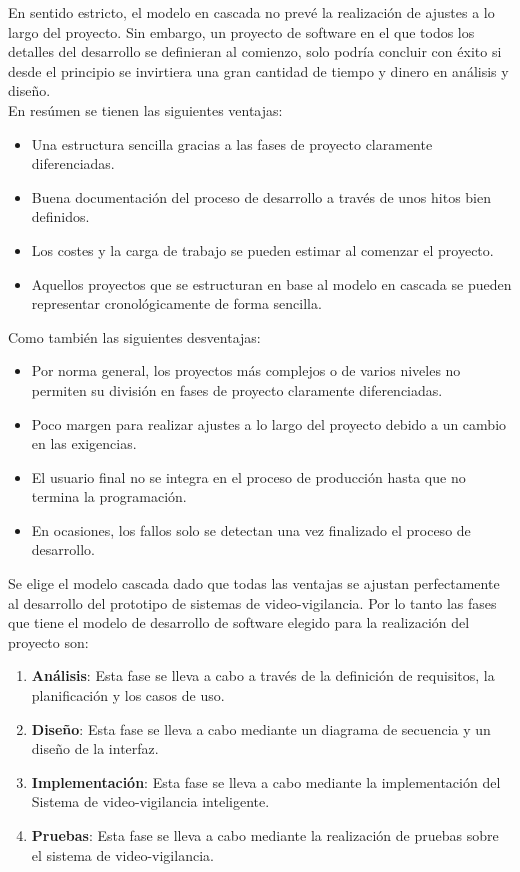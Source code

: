 En sentido estricto, el modelo en cascada no prevé la realización de ajustes a lo largo del proyecto. Sin embargo, un proyecto de software en el que todos los detalles del desarrollo se definieran al comienzo, solo podría concluir con éxito si desde el principio se invirtiera una gran cantidad de tiempo y dinero en análisis y diseño.\\

En resúmen se tienen las siguientes ventajas: 
\begin{itemize}
    \item Una estructura sencilla gracias a las fases de proyecto claramente diferenciadas.
    \item Buena documentación del proceso de desarrollo a través de unos hitos bien definidos.
    \item Los costes y la carga de trabajo se pueden estimar al comenzar el proyecto.
    \item Aquellos proyectos que se estructuran en base al modelo en cascada se pueden representar cronológicamente de forma sencilla.
\end{itemize}

Como también las siguientes desventajas:
\begin{itemize}
    \item  Por norma general, los proyectos más complejos o de varios niveles no permiten su división en fases de proyecto claramente diferenciadas.
    \item Poco margen para realizar ajustes a lo largo del proyecto debido a un cambio en las exigencias.
    \item El usuario final no se integra en el proceso de producción hasta que no termina la programación.
    \item En ocasiones, los fallos solo se detectan una vez finalizado el proceso de desarrollo.
\end{itemize}

Se elige el modelo cascada dado que todas las ventajas se ajustan perfectamente al desarrollo del prototipo de sistemas de video-vigilancia. Por lo tanto las fases que tiene el modelo de desarrollo de software elegido para la realización del proyecto son:

\begin{enumerate}
    \item \textbf{Análisis}: Esta fase se lleva a cabo a través de la definición de requisitos, la planificación y los casos de uso.
    \item \textbf{Diseño}: Esta fase se lleva a cabo mediante un diagrama de secuencia y un diseño de la interfaz.
    \item \textbf{Implementación}: Esta fase se lleva a cabo mediante la implementación del Sistema de video-vigilancia inteligente.
    \item \textbf{Pruebas}: Esta fase se lleva a cabo mediante la realización de pruebas sobre el sistema de video-vigilancia.
\end{enumerate}
